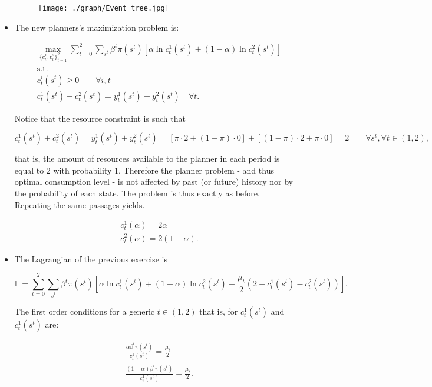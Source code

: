 \documentclass[12pt,a4paper]{article}
\begin{document}
\begin{itemize}
  \begin{figure}[h!]
    \centering
    \texttt{[image: ./graph/Event\_tree.jpg]}
  \end{figure}

\item The new planners's maximization problem is:

  \begin{align*}
    & \max_{\{ c_t^1, c_t^2 \}^{2}_{t = 1}} \sum^2_{t=0} \sum_{s^t} \beta^t \pi(s^t) [\alpha \ln c_t^1(s^t) + (1-\alpha) \ln c_t^2(s^t)] \\
    & \text{s.t.} \\
    & c_t^i(s^t) \geq 0 \qquad \forall i, t \\
    & c^1_t(s^t) + c^2_t(s^t) = y_t^1(s^t) +  y_t^2(s^t)\quad \forall t.
  \end{align*}

  Notice that the resource constraint is such that

    $$
      c^1_t(s^t) + c^2_t(s^t) = y_t^1(s^t) +  y_t^2(s^t) = [\pi \cdot 2 + (1-\pi) \cdot 0] + [(1-\pi) \cdot 2 + \pi \cdot 0] = 2 \qquad \forall s^t, \forall t \in (1,2),
    $$

  that is, the amount of resources available to the planner in each period is equal to 2 with probability 1. Therefore the planner problem - and thus optimal consumption level - is not affected by past (or future) history nor by the probability of each state. The problem is thus exactly as before. Repeating the same passages  yields.

    \begin{align*}
      & c_t^1 (\alpha) = 2 \alpha \\
      & c_t^2 (\alpha) = 2(1-\alpha).
    \end{align*}

  \item The Lagrangian of the previous exercise is

    $$
      \mathbb{L} = \sum^2_{t=0} \sum_{s^t} \beta^t \pi(s^t) \left[ \alpha \ln c_t^1(s^t) + (1-\alpha) \ln c_t^2(s^t) + \frac{\mu_t}{2} \left(2 - c^1_t(s^t) - c_t^2(s^t) \right)\right].
    $$

  The first order conditions for a generic $t \in (1, 2)$ that is, for $c_t^1(s^t)$ and $c_t^1(s^t)$ are:

  \begin{align*}
    & \frac{\alpha\beta^t \pi(s^t)}{c_t^1(s^t)} = \frac{\mu_t}{2} \\
    & \frac{(1 -\alpha)\beta^t \pi(s^t)}{c_t^1(s^t)} = \frac{\mu_t}{2}.
  \end{align*}


\end{itemize}
\end{document}
